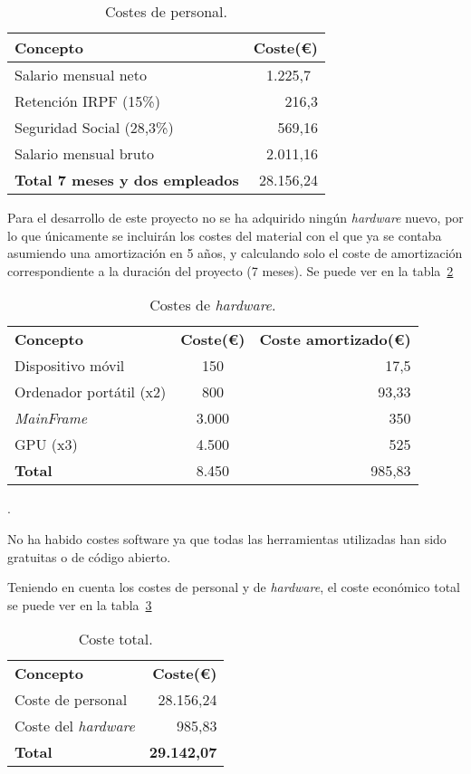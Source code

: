 \begin{table}\centering
	\begin{tabular}[]{@{}l r@{}}
		\toprule
		\textbf{Concepto} & \textbf{Coste(\euro{})} \\
		\midrule
		Salario mensual neto & 1.225,7~\cite{salariales} \\
		Retención IRPF (15\%) & 216,3 \\
		Seguridad Social (28,3\%) & 569,16 \\
		Salario mensual bruto & 2.011,16 \\\hubu
		\textbf{Total 7 meses y dos empleados} &  28.156,24 \\
		\bottomrule
	\end{tabular}
	\caption{Costes de personal.}
	\label{tab:costes_personal}
\end{table}

Para el desarrollo de este proyecto no se ha adquirido ningún \textit{hardware} nuevo, por lo que únicamente se incluirán los costes del material con el que ya se contaba asumiendo una amortización en 5 años, y calculando solo el coste de amortización correspondiente a la duración del proyecto (7 meses). Se puede ver en la tabla~\ref{tab:costes_hardware}

\begin{table}
	\centering
	\begin{tabular}[]{@{}l c r@{}}
		\toprule
		\textbf{Concepto} & \textbf{Coste(\euro{})} & \textbf{Coste amortizado(\euro{})} \\
		Dispositivo móvil & 150 & 17,5 \\
		Ordenador portátil (x2) & 800 & 93,33 \\
		\textit{MainFrame} & 3.000 & 350 \\ 
		GPU (x3) & 4.500 & 525 \\\hubu
		\textbf{Total} & 8.450 & 985,83
	\end{tabular}
	\caption{Costes de \textit{hardware}.}
	\label{tab:costes_hardware}.
\end{table}

No ha habido costes software ya que todas las herramientas utilizadas han sido gratuitas o de código abierto.

Teniendo en cuenta los costes de personal y de \textit{hardware}, el coste económico total se puede ver en la tabla~\ref{tab:coste_total}

\begin{table}
	\centering
	\begin{tabular}[]{@{}l r@{}}
		\toprule
		\textbf{Concepto} & \textbf{Coste(\euro{})} \\
		Coste de personal & 28.156,24 \\ 
		Coste del \textit{hardware} & 985,83 \\\hubu
		\textbf{Total} & \textbf{29.142,07} \\		
	\end{tabular}
	\caption{Coste total.}
	\label{tab:coste_total}
\end{table}


